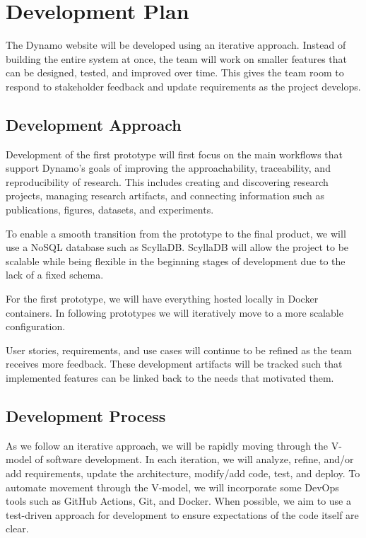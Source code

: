 \chapter{Development Plan}

The Dynamo website will be developed using an iterative approach. Instead of building the entire system at once, the team will work on smaller features that can be designed, tested, and improved over time. This gives the team room to respond to stakeholder feedback and update requirements as the project develops.

\section{Development Approach}

Development of the first prototype will first focus on the main workflows that support Dynamo's goals of
improving the approachability, traceability, and reproducibility of research. This includes creating and discovering research projects, managing research artifacts, and connecting information such as publications, figures, datasets, and experiments.

To enable a smooth transition from the prototype to the final product, we will use a NoSQL database such as ScyllaDB. ScyllaDB will allow the project to be scalable while being flexible in the beginning stages of development due to the lack of a fixed schema. 

For the first prototype, we will have everything hosted locally in Docker containers. In following prototypes we will iteratively move to a more scalable configuration. 

User stories, requirements, and use cases will continue to be refined as the team receives more feedback. These development artifacts will be tracked such that implemented features can be linked back to the needs that
motivated them.


\section{Development Process}

As we follow an iterative approach, we will be rapidly moving through the V-model of software development. In each iteration, we will analyze, refine, and/or add requirements, update the architecture, modify/add code, test, and deploy. To automate movement through the V-model, we will incorporate some DevOps tools such as GitHub Actions, Git, and Docker. When possible, we aim to use a test-driven approach for development to ensure expectations of the code itself are clear. 


